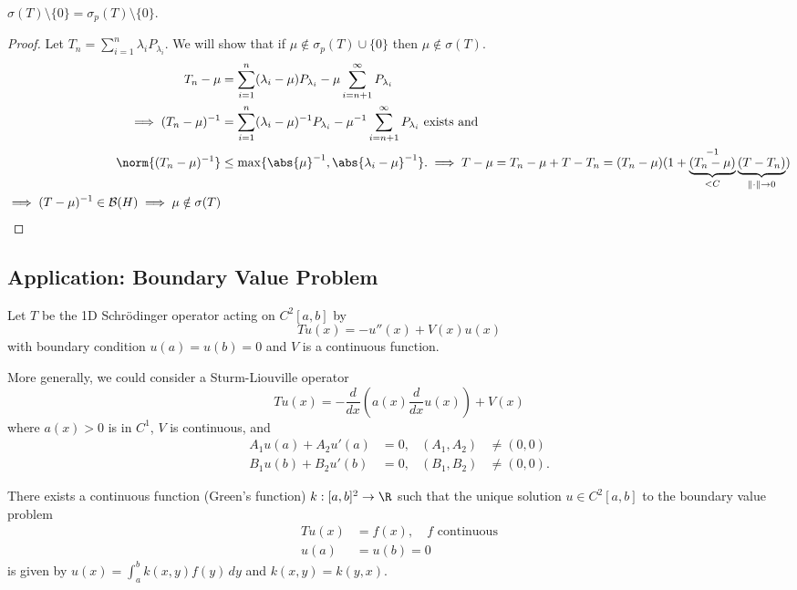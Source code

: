 \documentclass{article}
\begin{document}
\begin{cor}
    $\sigma(T) \setminus \{0\} = \sigma_p(T) \setminus \{0\}$.
\end{cor}

\begin{proof}
    Let $T_n = \sum_{i=1}^n \lambda_i P_{\lambda_i}$. We will show that if $\mu \notin \sigma_p(T) \cup \{0\}$ then $\mu \notin \sigma(T)$.
    \begin{align*}
        T_n - \mu &= \sum_{i=1}^n (\lambda_i - \mu) P_{\lambda_i} - \mu \sum_{i=n+1}^\infty P_{\lambda_i} \\
        \implies (T_n - \mu)^{-1} &= \sum_{i=1}^n (\lambda_i - \mu)^{-1} P_{\lambda_i} - \mu^{-1} \sum_{i=n+1}^\infty P_{\lambda_i} \text{ exists and} \\
        \norm{(T_n - \mu)^{-1}} &\leq \max\{\abs{\mu}^{-1}, \abs{\lambda_i-\mu}^{-1}\}.
        \implies T - \mu = T_n - \mu + T - T_n = (T_n - \mu)(1 + \underbrace{(T_n - \mu)}_{<C}^{-1}\underbrace{(T-T_n)}_{\|\cdot\| \to 0}) \\
        \implies (T-\mu)^{-1} \in \mathcal{B}(H) \implies \mu \notin \sigma(T)
    \end{align*}
\end{proof}

\subsection{Application: Boundary Value Problem}
Let $T$ be the 1D Schr\"odinger operator acting on $C^2[a,b]$ by
\begin{equation*}
    Tu(x) = -u''(x) + V(x) u(x)
\end{equation*}
with boundary condition $u(a) = u(b) = 0$ and $V$ is a continuous function.

More generally, we could consider a Sturm-Liouville operator
\[Tu(x) = -\frac{d}{dx}\left(a(x) \frac{d}{dx} u(x)\right) + V(x)\]
where $a(x)>0$ is in $C^1$, $V$ is continuous, and
\begin{align*}
    A_1 u(a) + A_2 u'(a) &= 0, & (A_1, A_2) &\neq (0,0) \\
    B_1 u(b) + B_2 u'(b) &= 0, & (B_1, B_2) &\neq (0,0).
\end{align*}

\begin{thm}
    There exists a continuous function (Green's function) $k: [a,b]^2 \to \R$ such that the unique solution $u \in C^2 [a,b]$ to the boundary value problem
    \begin{equation}
    \begin{aligned}
        Tu(x) &= f(x), \quad f \text{ continuous} \\
        u(a) &= u(b) = 0
    \end{aligned}
    \tag{$*$}\label{eq:23star}
    \end{equation}
    is given by $u(x) = \int_a^b k(x,y) f(y) \, dy$ and $k(x,y) = k(y,x)$.
\end{thm}
\end{document}
